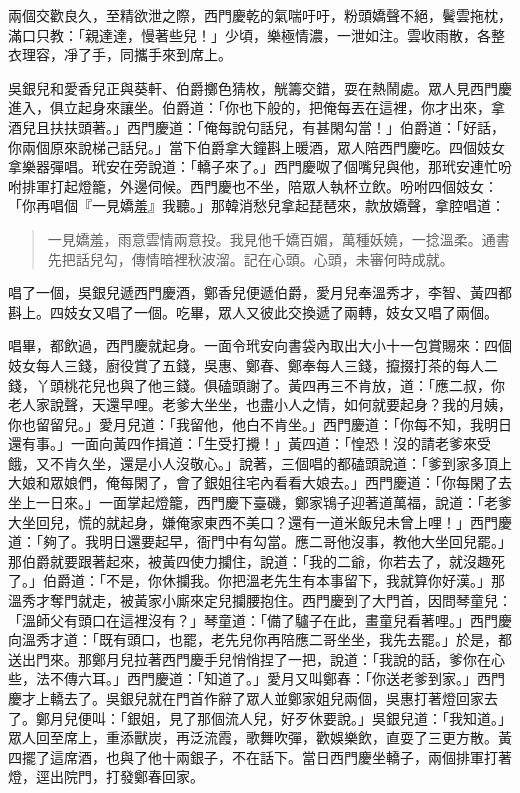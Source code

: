 兩個交歡良久，至精欲泄之際，西門慶乾的氣喘吁吁，粉頭嬌聲不絕，鬢雲拖枕，滿口只教：「親達達，慢著些兒！」少頃，樂極情濃，一泄如注。雲收雨散，各整衣理容，凈了手，同攜手來到席上。

吳銀兒和愛香兒正與葵軒、伯爵擲色猜枚，觥籌交錯，耍在熱鬧處。眾人見西門慶進入，俱立起身來讓坐。伯爵道：「你也下般的，把俺每丟在這裡，你才出來，拿酒兒且扶扶頭著。」西門慶道：「俺每說句話兒，有甚閑勾當！」伯爵道：「好話，你兩個原來說梯己話兒。」當下伯爵拿大鐘斟上暖酒，眾人陪西門慶吃。四個妓女拿樂器彈唱。玳安在旁說道：「轎子來了。」西門慶呶了個嘴兒與他，那玳安連忙吩咐排軍打起燈籠，外邊伺候。西門慶也不坐，陪眾人執杯立飲。吩咐四個妓女：「你再唱個『一見嬌羞』我聽。」那韓消愁兒拿起琵琶來，款放嬌聲，拿腔唱道：
\begin{quote}
一見嬌羞，雨意雲情兩意投。我見他千嬌百媚，萬種妖嬈，一捻溫柔。通書先把話兒勾，傳情暗裡秋波溜。記在心頭。心頭，未審何時成就。
\end{quote}

唱了一個，吳銀兒遞西門慶酒，鄭香兒便遞伯爵，愛月兒奉溫秀才，李智、黃四都斟上。四妓女又唱了一個。吃畢，眾人又彼此交換遞了兩轉，妓女又唱了兩個。

唱畢，都飲過，西門慶就起身。一面令玳安向書袋內取出大小十一包賞賜來：四個妓女每人三錢，廚役賞了五錢，吳惠、鄭春、鄭奉每人三錢，攛掇打茶的每人二錢，丫頭桃花兒也與了他三錢。俱磕頭謝了。黃四再三不肯放，道：「應二叔，你老人家說聲，天還早哩。老爹大坐坐，也盡小人之情，如何就要起身？我的月姨，你也留留兒。」愛月兒道：「我留他，他白不肯坐。」西門慶道：「你每不知，我明日還有事。」一面向黃四作揖道：「生受打攪！」黃四道：「惶恐！沒的請老爹來受餓，又不肯久坐，還是小人沒敬心。」說著，三個唱的都磕頭說道：「爹到家多頂上大娘和眾娘們，俺每閑了，會了銀姐往宅內看看大娘去。」西門慶道：「你每閑了去坐上一日來。」一面掌起燈籠，西門慶下臺磯，鄭家鴇子迎著道萬福，說道：「老爹大坐回兒，慌的就起身，嫌俺家東西不美口？還有一道米飯兒未曾上哩！」西門慶道：「夠了。我明日還要起早，衙門中有勾當。應二哥他沒事，教他大坐回兒罷。」那伯爵就要跟著起來，被黃四使力攔住，說道：「我的二爺，你若去了，就沒趣死了。」伯爵道：「不是，你休攔我。你把溫老先生有本事留下，我就算你好漢。」那溫秀才奪門就走，被黃家小廝來定兒攔腰抱住。西門慶到了大門首，因問琴童兒：「溫師父有頭口在這裡沒有？」琴童道：「備了驢子在此，畫童兒看著哩。」西門慶向溫秀才道：「既有頭口，也罷，老先兒你再陪應二哥坐坐，我先去罷。」於是，都送出門來。那鄭月兒拉著西門慶手兒悄悄捏了一把，說道：「我說的話，爹你在心些，法不傳六耳。」西門慶道：「知道了。」愛月又叫鄭春：「你送老爹到家。」西門慶才上轎去了。吳銀兒就在門首作辭了眾人並鄭家姐兒兩個，吳惠打著燈回家去了。鄭月兒便叫：「銀姐，見了那個流人兒，好歹休要說。」吳銀兒道：「我知道。」眾人回至席上，重添獸炭，再泛流霞，歌舞吹彈，歡娛樂飲，直耍了三更方散。黃四擺了這席酒，也與了他十兩銀子，不在話下。當日西門慶坐轎子，兩個排軍打著燈，逕出院門，打發鄭春回家。


